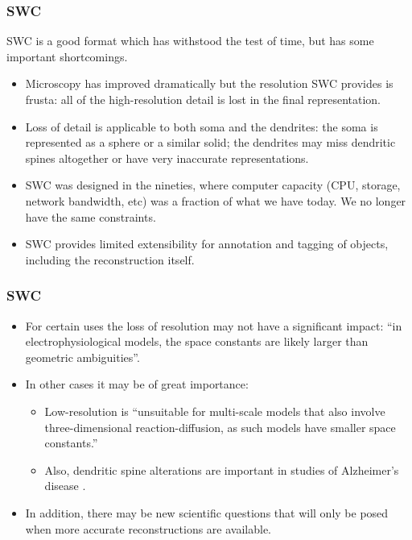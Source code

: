 \documentclass{beamer}
\begin{document}
\begin{frame}
\frametitle{SWC}

SWC is a good format which has withstood the test of time, but has
some important shortcomings.
\pause

\begin{itemize}
\item Microscopy has improved dramatically but the resolution SWC
  provides is frusta: all of the high-resolution detail is lost in the
  final representation.
\pause
\item Loss of detail is applicable to both soma and the dendrites: the
  soma is represented as a sphere or a similar solid; the dendrites
  may miss dendritic spines altogether or have very inaccurate
  representations.
\pause
\item SWC was designed in the nineties, where computer capacity (CPU,
  storage, network bandwidth, etc) was a fraction of what we have
  today. We no longer have the same constraints.
\pause
\item SWC provides limited extensibility for annotation and tagging
  of objects, including the reconstruction itself.
\pause
\end{itemize}

\end{frame}

\begin{frame}
\frametitle{SWC}

\begin{itemize}
\item For certain uses the loss of resolution may not have a
  significant impact: ``in electrophysiological models, the space
  constants are likely larger than geometric
  ambiguities''\cite{mcdougal2013water}.
\pause
\item In other cases it may be of great importance:
  \begin{itemize}
  \item Low-resolution is ``unsuitable for multi-scale models that
    also involve three-dimensional reaction-diffusion, as such models
    have smaller space constants.''\cite{mcdougal2013water}
  \pause
  \item Also, dendritic spine alterations are important in studies of
    Alzheimer's disease \cite{smith2009reversal}.
  \pause
  \end{itemize}
\item In addition, there may be new scientific questions that will
  only be posed when more accurate reconstructions are available.
\pause
\end{itemize}

\end{frame}
\end{document}
